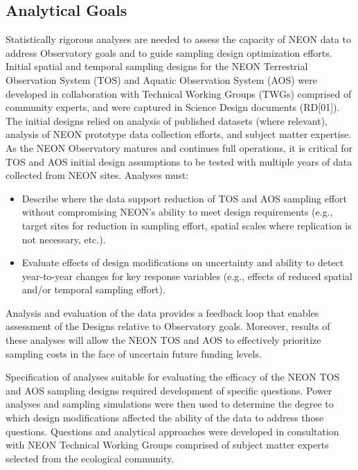\documentclass[
  11pt,
]{article}
\providecommand{\tightlist}{%
  \setlength{\itemsep}{0pt}\setlength{\parskip}{0pt}}
\begin{document}
\subsection{Analytical Goals}\label{analytical-goals}

Statistically rigorous analyses are needed to assess the capacity of
NEON data to address Observatory goals and to guide sampling design
optimization efforts. Initial spatial and temporal sampling designs for
the NEON Terrestrial Observation System (TOS) and Aquatic Observation
System (AOS) were developed in collaboration with Technical Working
Groups (TWGs) comprised of community experts, and were captured in
Science Design documents (RD{[}01{]}). The initial designs relied on
analysis of published datasets (where relevant), analysis of NEON
prototype data collection efforts, and subject matter expertise.\\
As the NEON Observatory matures and continues full operations, it is
critical for TOS and AOS initial design assumptions to be tested with
multiple years of data collected from NEON sites. Analyses must:

\begin{itemize}
\tightlist
\item
  Describe where the data support reduction of TOS and AOS sampling
  effort without compromising NEON's ability to meet design requirements
  (e.g., target sites for reduction in sampling effort, spatial scales
  where replication is not necessary, etc.).
\item
  Evaluate effects of design modifications on uncertainty and ability to
  detect year-to-year changes for key response variables (e.g., effects
  of reduced spatial and/or temporal sampling effort).
\end{itemize}

Analysis and evaluation of the data provides a feedback loop that
enables assessment of the Designs relative to Observatory goals.
Moreover, results of these analyses will allow the NEON TOS and AOS to
effectively prioritize sampling costs in the face of uncertain future
funding levels.

Specification of analyses suitable for evaluating the efficacy of the
NEON TOS and AOS sampling designs required development of specific
questions. Power analyses and sampling simulations were then used to
determine the degree to which design modifications affected the ability
of the data to address those questions. Questions and analytical
approaches were developed in consultation with NEON Technical Working
Groups comprised of subject matter experts selected from the ecological
community.
\end{document}
